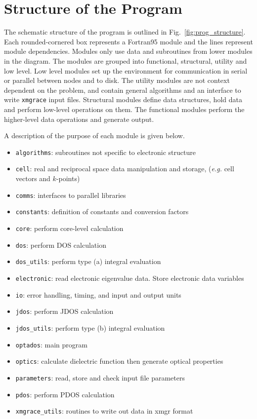 \documentclass[a4paper,11pt,twoside]{book}
\begin{document}
{%
\chapter{Structure of the Program} \label{sec:structure}
The schematic structure of the program is outlined in Fig.~\ref{fig:prog_structure}. 
%
Each rounded-cornered box represents a Fortran95 module and the lines represent module dependencies. 
%
Modules only use data and subroutines from lower modules in the diagram. 
%
The modules are grouped into functional, structural, utility and low level.
%
Low level modules set up the environment for communication in serial or parallel between nodes and to disk. 
%
The utility modules are not context dependent on the problem, and contain general algorithms and an interface to write \texttt{xmgrace} input files.
%
Structural modules define data structures, hold data and perform low-level operations on them.
%
The functional modules perform the higher-level data operations and generate output.

%
A description of the purpose of each module is given below.


\begin{itemize}
\item \texttt{algorithms}: subroutines not specific to electronic structure
\item \texttt{cell}: real and reciprocal space data manipulation and storage, (\emph{e.g.} cell vectors and $k$-points)
\item \texttt{comms}: interfaces to parallel libraries
\item \texttt{constants}: definition of constants and conversion factors
\item \texttt{core}: perform core-level calculation
\item \texttt{dos}: perform DOS calculation
\item \texttt{dos\_utils}: perform type (a) integral evaluation
\item \texttt{electronic}: read electronic eigenvalue data. Store electronic data variables
\item \texttt{io}: error handling, timing, and input and output units
\item \texttt{jdos}: perform JDOS calculation
\item \texttt{jdos\_utils}: perform type (b) integral evaluation
\item \texttt{optados}: main program
\item \texttt{optics}: calculate dielectric function then generate optical properties
\item \texttt{parameters}: read, store and check input file parameters
\item \texttt{pdos}: perform PDOS calculation
\item \texttt{xmgrace\_utils}: routines to write out data in xmgr format
\end{itemize}

}
\end{document}
